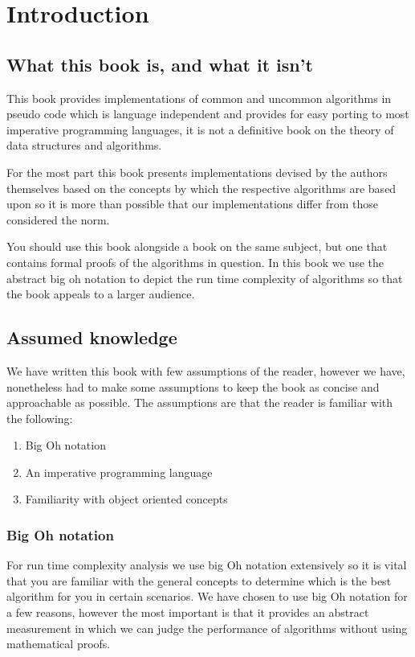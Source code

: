 \chapter{Introduction}

\section{What this book is, and what it isn't}
This book provides implementations of common and uncommon algorithms in pseudo code which is language independent and provides for easy porting to most imperative programming languages, it is not a definitive book on the theory of data structures and algorithms.

For the most part this book presents implementations devised by the authors themselves based on the concepts by which the respective algorithms are based upon so it is more than possible that our implementations differ from those considered the norm.

You should use this book alongside a book on the same subject, but one that contains formal proofs of the algorithms in question. In this book we use the abstract big oh notation to depict the run time complexity of algorithms so that the book appeals to a larger audience.

\section{Assumed knowledge}
We have written this book with few assumptions of the reader, however we have, nonetheless had to make some assumptions to keep the book as concise and approachable as possible. The assumptions are that the reader is familiar with the following:

\begin{enumerate}
\item Big Oh notation
\item An imperative programming language
\item Familiarity with object oriented concepts
\end{enumerate}

\subsection{Big Oh notation}
For run time complexity analysis we use big Oh notation extensively so it is vital that you are familiar with the general concepts to determine which is the best algorithm for you in certain scenarios. We have chosen to use big Oh notation for a few reasons, however the most important is that it provides an abstract measurement in which we can judge the performance of algorithms without using mathematical proofs.

